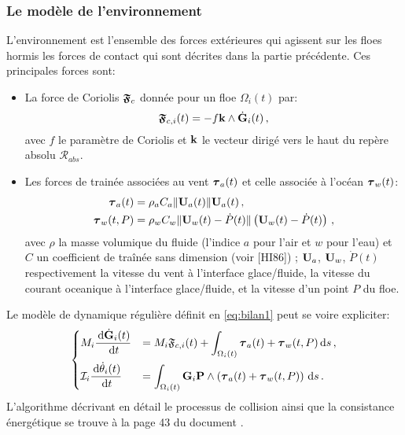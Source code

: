 
\subsubsection{Le modèle de l'environnement}


L’environnement est l’ensemble des forces extérieures qui agissent sur les floes hormis les forces de contact qui sont décrites dans la partie précédente. Ces principales forces sont:
\begin{itemize}
    \item La force de Coriolis $\bm{\mathrm{\mathfrak{F}}}_c$ donnée pour un floe $\Omega_i(t)$ par:
    $$
    \bm{\mathrm{\mathfrak{F}}}_{c,i}(t) = -f\bm{\mathrm{k}} \wedge \dot{\bm{\mathrm{G}}}_i(t) \,,
    $$
    avec $f$ le paramètre de Coriolis et $\bm{\mathrm{k}}$ le vecteur dirigé vers le haut du repère absolu $\mathcal{R}_{abs}$.
    \item Les forces de trainée associées au vent $\bm{\mathrm{\tau}}_a(t)$ et celle associée à l'océan $\bm{\mathrm{\tau}}_w(t)$: 
    \begin{align*}
        \bm{\mathrm{\tau}}_a(t) &= \rho_a C_a \Vert \bm{\mathrm{U}}_a(t) \Vert \bm{\mathrm{U}}_a(t) \,, \\        
        \bm{\mathrm{\tau}}_w(t,P) &= \rho_w C_w \Vert \bm{\mathrm{U}}_w(t) - \dot{P}(t) \Vert \left(\bm{\mathrm{U}}_w(t) - \dot{P}(t) \right) \,,
    \end{align*}
    avec $\rho$ la masse volumique du fluide (l'indice $a$ pour l'air et $w$ pour l'eau) et $C$ un coefficient de traînée sans dimension (voir [HI86]) ; $\bm{\mathrm{U}}_a$, $\bm{\mathrm{U}}_w$, $\dot{P}(t)$ respectivement la vitesse du vent à l'interface glace/fluide, la vitesse du courant oceanique à l'interface glace/fluide, et la vitesse d'un point $P$ du floe. 
\end{itemize}

Le modèle de dynamique régulière définit en \cref{eq:bilan1} peut se voire expliciter:
\begin{align*}
    \begin{dcases}
            M_i \frac{\diff \dot{\bvec{G}}_i(t)}{\diff{t}} &= M_i \mathfrak{F}_{c,i}(t) + \int_{\Omega_i(t)} \bvec{\tau}_a(t) + \bvec{\tau}_w(t,P) \diff s \,,\\
            \mathcal{I}_i \frac{\diff \dot{\theta}_i(t)}{\diff t} &= \int_{\Omega_i(t)} \bvec{G}_i\bvec{P} \wedge \left(\bvec{\tau}_a(t) + \bvec{\tau}_w(t,P)\right) \diff s \,.
    \end{dcases}
\end{align*} 
L'algorithme décrivant en détail le processus de collision ainsi que la consistance énergétique se trouve à la page 43 du document \parencite{rabatel2015thesis}.


